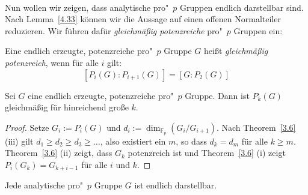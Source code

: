 \documentclass[11pt,a4paper,openany]{memoir}
\begin{document}
\paragraph{} Nun wollen wir zeigen, dass analytische pro"~$p$ Gruppen endlich darstellbar sind. Nach Lemma~\ref{4.33} können wir die Aussage auf einen offenen Normalteiler reduzieren. Wir führen dafür \textit{gleichmäßig potenzreiche} pro"~$p$ Gruppen ein:

\begin{definition}
Eine endlich erzeugte, potenzreiche pro"~$p$ Gruppe $G$ heißt \textit{gleichmäßig potenzreich}, wenn für alle $i$ gilt:
\[[P_i(G):P_{i+1}(G)]=[G:P_2(G)] \]
\end{definition}

\begin{lemma}\label{4.2} 
Sei $G$ eine endlich erzeugte, potenzreiche pro"~$p$ Gruppe. Dann ist $P_k(G)$ gleich\-mäßig für hinreichend große $k$.
\end{lemma}

\begin{proof}
Setze $G_i:=P_i(G)$ und $d_i:=\dim_{\mathbb{F}_p}(G_i/G_{i+1})$. Nach Theorem~\ref{3.6} (iii) gilt $d_1\geq d_2\geq d_3\geq\ldots$, also existiert ein $m$, so dass $d_k=d_m$ für alle $k\geq m$. Theorem~\ref{3.6} (ii) zeigt, dass $G_k$ potenzreich ist und Theorem~\ref{3.6} (i) zeigt $P_i(G_k)=G_{k+i-1}$ für alle $i$ und $k$.
\end{proof}

\begin{theorem}
Jede analytische pro"~$p$ Gruppe $G$ ist endlich darstellbar.
\end{theorem}
\end{document}
